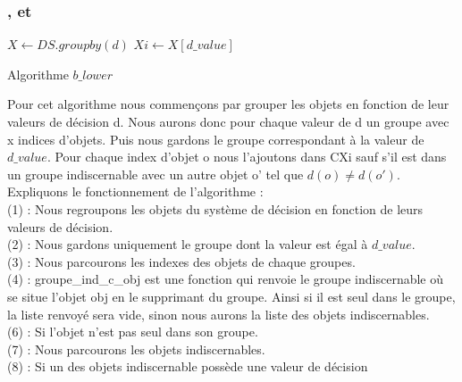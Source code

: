 \subsubsection{\bupper, \blower et \bboundary}
\begin{algorithm}[h!]
	\SetAlgoLined
	\LinesNumbered
	$X \gets DS.groupby(d)$\;
	$Xi \gets X[d\_value]$\;
	\caption{Algorithme $b\_lower$}
\end{algorithm}
Pour cet algorithme nous commençons par grouper les objets en fonction de
leur valeurs de décision d. Nous aurons donc pour chaque valeur de d un
groupe avec x indices d'objets. Puis nous gardons le groupe correspondant
à la valeur de $d\_value$. Pour chaque index d'objet o nous l'ajoutons dans
CXi sauf s'il est dans un groupe indiscernable avec un autre objet o'
tel que $d(o) \neq d(o')$. \\
\newpage
Expliquons le fonctionnement de l'algorithme : \\
(1) : Nous regroupons les objets du système de décision en fonction
de leurs valeurs de décision. \\
(2) : Nous gardons uniquement le groupe dont la valeur est égal à
$d\_value$. \\
(3) : Nous parcourons les indexes des objets de chaque groupes. \\
(4) : groupe\_ind\_c\_obj est une fonction qui renvoie le
groupe indiscernable où se situe l'objet obj en le supprimant du groupe.
Ainsi si il est seul dans le groupe, la liste
renvoyé sera vide, sinon nous aurons la liste des objets indiscernables. \\
(6) :  Si l'objet n'est pas seul dans son groupe. \\
(7) : Nous parcourons les objets indiscernables. \\
(8) : Si un des objets indiscernable possède une valeur de décision
